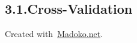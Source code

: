 \documentclass{article}
\begin{document}
\subsection{3.1.\hspace*{0.5em}Cross-Validation}\label{sec-cross-validation}%

\begin{mdbmargintb}{4em}{}%
\begin{mdflushright}%
{\tiny{}Created with~\href{https://www.madoko.net}{Madoko.net}.}%
\end{mdflushright}%
\end{mdbmargintb}%
\end{document}
